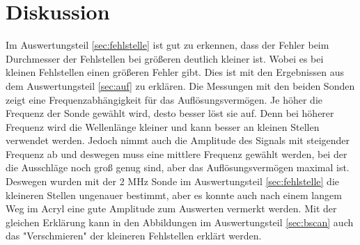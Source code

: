 \section{Diskussion}
\label{sec:Diskussion}
Im Auswertungsteil \ref{sec:fehlstelle} ist gut zu erkennen, dass der Fehler beim Durchmesser der Fehlstellen bei größeren deutlich kleiner ist.
Wobei es bei kleinen Fehlstellen einen größeren Fehler gibt.
Dies ist mit den Ergebnissen aus dem Auswertungsteil \ref{sec:auf} zu erklären.
Die Messungen mit den beiden Sonden zeigt eine Frequenzabhängigkeit für das Auflösungsvermögen.
Je höher die Frequenz der Sonde gewählt wird, desto besser löst sie auf.
Denn bei höherer Frequenz wird die Wellenlänge kleiner und kann besser an kleinen Stellen verwendet werden.
Jedoch nimmt auch die Amplitude des Signals mit steigender Frequenz ab und deswegen muss eine mittlere Frequenz gewählt werden,
bei der die Ausschläge noch groß genug sind, aber das Auflösungsvermögen maximal ist.
Deswegen wurden mit der 2 MHz Sonde im Auswertungsteil \ref{sec:fehlstelle} die kleineren Stellen ungenauer bestimmt, 
aber es konnte auch nach einem langem Weg im Acryl eine gute Amplitude zum Auswerten vermerkt werden.
Mit der gleichen Erklärung kann in den Abbildungen im Auswertungsteil \ref{sec:bscan} auch das "Verschmieren" der kleineren Fehlstellen erklärt werden.